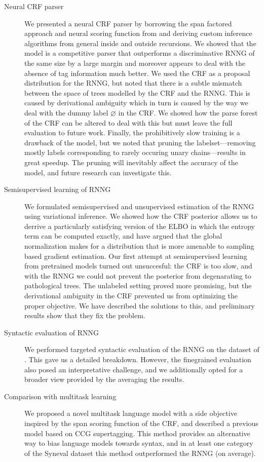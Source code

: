   \begin{description}
    \item[Neural CRF parser]
      We presented a neural CRF parser by borrowing the span factored approach and neural scoring function from \cite{stern2017minimal} and deriving custom inference algorithms from general inside and outside recursions. We showed that the model is a competitive parser that outperforms a discriminative RNNG of the same size by a large margin and moreover appears to deal with the absence of tag information much better. We used the CRF as a proposal distribution for the RNNG, but noted that there is a subtle mismatch between the space of trees modelled by the CRF and the RNNG. This is caused by derivational ambiguity which in turn is caused by the way we deal with the dummy label $\varnothing$ in the CRF. We showed how the parse forest of the CRF can be altered to deal with this but must leave the full evaluation to future work. Finally, the prohibitively slow training is a drawback of the model, but we noted that pruning the labelset---removing mostly labels corresponding to rarely occuring unary chains---results in great speedup. The pruning will inevitably affect the accuracy of the model, and future research can investigate this.

    \item[Semisupervised learning of RNNG]
      We formulated semisupervised and unsupervised estimation of the RNNG using variational inference. We showed how the CRF posterior allows us to derrive a particularly satisfying version of the ELBO in which the entropy term can be computed exactly, and have argued that the global normalization makes for a distribution that is more amenable to sampling based gradient estimation. Our first attempt at semisupervised learning from pretrained models turned out unsuccesful: the CRF is too slow, and with the RNNG we could not prevent the posterior from degenarating to pathological trees. The unlabeled setting proved more promising, but the derivational ambiguity in the CRF prevented us from optimizing the proper objective. We have described the solutions to this, and preliminary results show that they fix the problem.

    \item[Syntactic evaluation of RNNG]
      We performed targeted syntactic evaluation of the RNNG on the dataset of \citet{linzen2018targeted}. This gave us a detailed breakdown. However, the finegrained evaluation also posed an interpretative challenge, and we additionally opted for a broader view provided by the averaging the results.

    \item[Comparison with multitask learning]
      We proposed a novel multitask language model with a side objective inspired by the span scoring function of the CRF, and described a previous model based on CCG supertagging. This method provides an alternative way to bias language models towards syntax, and in at least one category of the Syneval dataset this method outperformed the RNNG (on average).

  \end{description}

